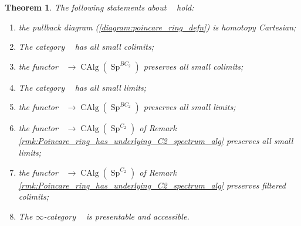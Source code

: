 \documentclass{article}
\DeclareMathOperator{\CAlg}{CAlg} %
\DeclareMathOperator{\CAlgp}{CAlg^p} %
\DeclareMathOperator{\Spectra}{Sp} %
\newtheorem{theorem}[equation]{Theorem}
\theoremstyle{definition}
\begin{document}
\begin{theorem}\label{thm:poincare_rings_cat_formal_properties}
    The following statements about $\CAlgp$ hold:
    \begin{enumerate}[label=(\arabic*)]
        \item \label{thmitem:defining_diagram_homotopy_pullback} the pullback diagram (\ref{diagram:poincare_ring_defn}) is homotopy Cartesian; %
        \item \label{thmitem:poincare_ring_has_colimits} The category $\CAlgp$ has all small colimits;
        \item \label{thmitem:poincare_ring_to_naive_ring_preserves_colims} the functor $ \CAlgp \to \CAlg(\Spectra^{BC_2})$ preserves all small colimits;
        \item \label{thmitem:poincare_ring_has_limits} The category $\CAlgp$ has all small limits;
        \item \label{thmitem:poincare_ring_to_naive_ring_preserves_lims} the functor $ \CAlgp \to \CAlg(\Spectra^{BC_2})$ preserves all small limits;
        \item \label{thmitem:poincare_ring_to_ring_preserves_lims} the functor $ \CAlgp \to \CAlg\left(\Spectra^{C_2}\right) $ of Remark \ref{rmk:Poincare_ring_has_underlying_C2_spectrum_alg} preserves all small limits;
        \item \label{thmitem:poincare_ring_to_ring_preserves_filt_colims} the functor $ \CAlgp \to \CAlg\left(\Spectra^{C_2}\right) $ of Remark \ref{rmk:Poincare_ring_has_underlying_C2_spectrum_alg} preserves filtered colimits;
        \item \label{thmitem:poincare_rings_presentable_accessible} The $ \infty $-category $ \CAlgp $ is presentable and accessible. 
    \end{enumerate}
\end{theorem}
\end{document}
